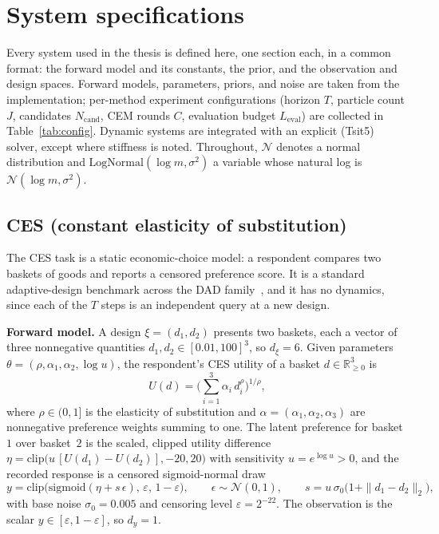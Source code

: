 \chapter{System specifications}
\label{app:systems}

Every system used in the thesis is defined here, one section each, in a common format:
the forward model and its constants, the prior, and the observation and design spaces.
Forward models, parameters, priors, and noise are taken from the implementation;
per-method experiment configurations (horizon $T$, particle count $J$, candidates
$N_{\mathrm{cand}}$, CEM rounds $C$, evaluation budget $L_{\mathrm{eval}}$) are collected
in Table~\ref{tab:config}. Dynamic systems are integrated with an explicit (Tsit5)
solver, except where stiffness is noted. Throughout, $\mathcal N$ denotes a normal
distribution and $\mathrm{LogNormal}(\log m,\sigma^2)$ a variable whose natural log is
$\mathcal N(\log m,\sigma^2)$.

\section{CES (constant elasticity of substitution)}
The CES task is a static economic-choice model: a respondent compares two baskets of
goods and reports a censored preference score. It is a standard adaptive-design benchmark
across the DAD family~\citep{foster2021deep,blau2022optimizing,hedman2025stepdad}, and it
has no dynamics, since each of the $T$ steps is an independent query at a new design.

\textbf{Forward model.} A design $\xi=(d_1,d_2)$ presents two baskets, each a vector of
three nonnegative quantities $d_1,d_2\in[0.01,100]^3$, so $d_\xi=6$. Given parameters
$\theta=(\rho,\alpha_1,\alpha_2,\log u)$, the respondent's CES utility of a basket
$d\in\mathbb{R}^3_{\ge 0}$ is
\[
U(d)=\Big(\textstyle\sum_{i=1}^3\alpha_i\,d_i^{\rho}\Big)^{1/\rho},
\]
where $\rho\in(0,1]$ is the elasticity of substitution and
$\alpha=(\alpha_1,\alpha_2,\alpha_3)$ are nonnegative preference weights summing to one.
The latent preference for basket~$1$ over basket~$2$ is the scaled, clipped utility
difference $\eta=\mathrm{clip}\big(u\,[U(d_1)-U(d_2)],-20,20\big)$ with sensitivity
$u=e^{\log u}>0$, and the recorded response is a censored sigmoid-normal draw
\[
y=\mathrm{clip}\big(\mathrm{sigmoid}(\eta+s\,\epsilon),\,\varepsilon,\,1-\varepsilon\big),
\qquad \epsilon\sim\mathcal N(0,1),\qquad
s=u\,\sigma_0\big(1+\|d_1-d_2\|_2\big),
\]
with base noise $\sigma_0=0.005$ and censoring level $\varepsilon=2^{-22}$. The
observation is the scalar $y\in[\varepsilon,1-\varepsilon]$, so $d_y=1$.

